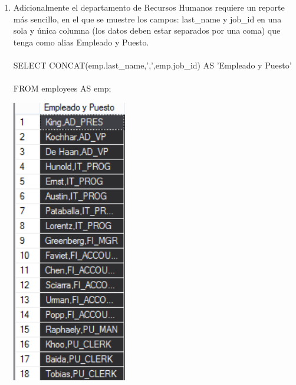 \begin{enumerate}[1.]
	\item Adicionalmente el departamento de Recursos Humanos requiere un reporte más sencillo, en el que se muestre los campos: last\_name y job\_id en una sola y \'unica columna (los datos deben estar separados por una coma) que tenga como alias Empleado y Puesto.
	\\
	\\SELECT CONCAT(emp.last\_name,',',emp.job\_id) AS 'Empleado y Puesto' \\
	\\FROM employees AS emp; \\
	\begin{center}
	\includegraphics[width=5cm]{./Imagenes/432} 
	\end{center}


\end{enumerate}
